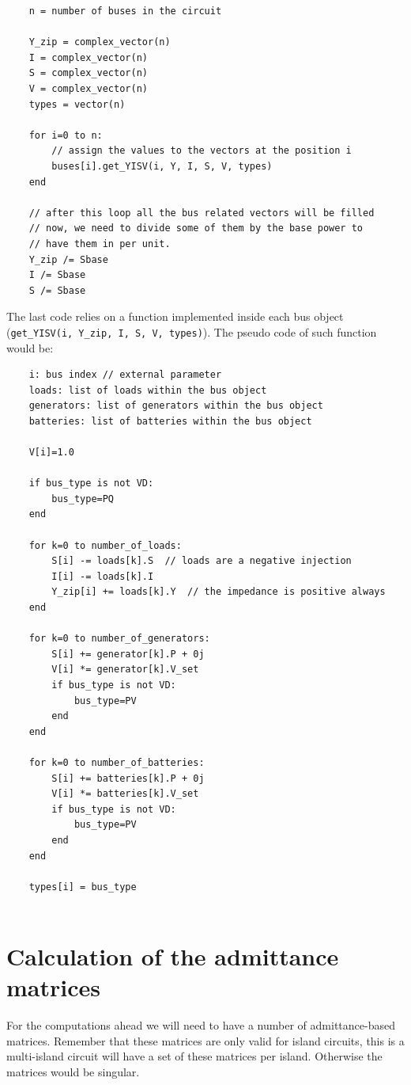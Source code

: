 \documentclass[nols,a4paper,twoside,notoc,fleqn]{tufte-book}
\begin{document}
{\color{verbatimcolor}
	\begin{verbatim}
	n = number of buses in the circuit
	
	Y_zip = complex_vector(n)
	I = complex_vector(n)
	S = complex_vector(n)
	V = complex_vector(n)
	types = vector(n)
	
	for i=0 to n:
	    // assign the values to the vectors at the position i
	    buses[i].get_YISV(i, Y, I, S, V, types) 
	end
	
	// after this loop all the bus related vectors will be filled
	// now, we need to divide some of them by the base power to 
	// have them in per unit.
	Y_zip /= Sbase
	I /= Sbase
	S /= Sbase
	\end{verbatim}
}

The last code relies on a function implemented inside each bus object (\verb|get_YISV(i, Y_zip, I, S, V, types)|). The pseudo code of such function would be:

{\color{verbatimcolor}
	\begin{verbatim}
	i: bus index // external parameter
	loads: list of loads within the bus object
	generators: list of generators within the bus object
	batteries: list of batteries within the bus object
	
	V[i]=1.0
	
	if bus_type is not VD:
	    bus_type=PQ
	end
	
	for k=0 to number_of_loads:
	    S[i] -= loads[k].S  // loads are a negative injection
	    I[i] -= loads[k].I
	    Y_zip[i] += loads[k].Y  // the impedance is positive always
	end
	
	for k=0 to number_of_generators:
	    S[i] += generator[k].P + 0j
	    V[i] *= generator[k].V_set
	    if bus_type is not VD: 
	        bus_type=PV
	    end
	end
	
	for k=0 to number_of_batteries:
	    S[i] += batteries[k].P + 0j
	    V[i] *= batteries[k].V_set
	    if bus_type is not VD: 
	        bus_type=PV
	    end
	end
	
	types[i] = bus_type
	
	\end{verbatim}
}


\newpage
\section{Calculation of the admittance matrices}  \label{Y_calculation}

For the computations ahead we will need to have a number of admittance-based matrices. Remember that these matrices are only valid for island circuits, this is a multi-island circuit will have a set of these matrices per island. Otherwise the matrices would be singular.
\end{document}
